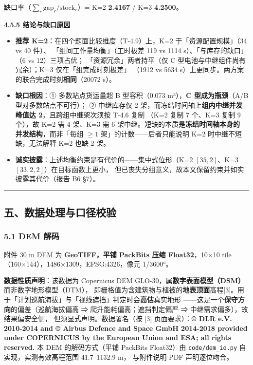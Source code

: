 \documentclass[
  10.5pt,
]{article}
\providecommand{\tightlist}{%
  \setlength{\itemsep}{0pt}\setlength{\parskip}{0pt}}
\begin{document}
缺口率（\(\sum_r \text{gap}_r/\text{stock}_r\)）= K=2 \textbf{2.4167} /
K=3 \textbf{4.2500}。

\textbf{4.5.5 结论与缺口原因}

\begin{itemize}
\tightlist
\item
  \textbf{推荐 K=2}：在四个题面比较维度（T-4.9）上，K=2
  于「资源配置规模」（34 vs 40 件）、 「组间工作量均衡」（工时极差 119
  vs 1114 s）、「与库存的缺口」（6 vs 12）三项占优；
  「资源冗余」两者持平（仅 C 型电池与中继组件尚有冗余）；K=3
  仅在「组完成时刻极差」 （1912 vs 5634
  s）上更同步。两方案的联合完成时刻\textbf{相同}（20072 s）。
\item
  \textbf{缺口根因}：① 多数站点货运量超 B 型容积（0.073 m³），\textbf{C
  型成为瓶颈}（A/B 型对多数站点不可行）； ② 中继库存仅 2
  架，而冻结时间轴上\textbf{组内中继并发峰值达 2}，且跨组中继架次须按
  T-4.6 复制 （K=2 复制 7 个、K=3 复制 9 个），故 K=2 需 4 架、K=3 需 6
  架中继。短缺的本质是\textbf{冻结时间轴本身的 并发结构}，而非「每组
  \(\ge 1\) 架」的计数------后者只能说明 K=2 时中继不短缺，无法解释 K=2
  也缺 2 架。
\item
  \textbf{诚实披露}：上述均衡约束是有代价的------集中式位形（K=2
  \([35,2]\)、K=3 \([33,2,2]\)）在目标函数上更小，
  但已丧失分组意义，故本文保留约束并如实披露其代价（报告 B6 §7）。
\end{itemize}

\begin{center}\rule{0.5\linewidth}{0.5pt}\end{center}

\subsection{五、数据处理与口径校验}\label{ux4e94ux6570ux636eux5904ux7406ux4e0eux53e3ux5f84ux6821ux9a8c}

\subsubsection{5.1 DEM 解码}\label{dem-ux89e3ux7801}

附件 30 m DEM 为 \textbf{GeoTIFF，平铺 PackBits 压缩 Float32}，10×10
tile（160×144），1486×1309，EPSG:4326，像元 1/3600°。

\textbf{数据性质声明}：该数据为 Copernicus DEM
GLO-30，属\textbf{数字表面模型（DSM）}而非数字地形模型（DTM），
即栅格值为含建筑物与植被的\textbf{地表顶面}高程{[}3{]}。用于「计划巡航海拔」与「视线遮挡」判定时会\textbf{高估}真实地形
------这是一个\textbf{保守方向}的偏差（巡航海拔偏高 ⇒
爬升能耗偏高；遮挡判定偏严 ⇒ 中继需求偏多），故结果偏安全侧，
但须显式声明。数据署名（按 {[}3{]} 页面要求）：\textbf{© DLR e.V.
2010-2014 and © Airbus Defence and Space GmbH 2014-2018 provided under
COPERNICUS by the European Union and ESA; all rights reserved.} 本 DEM
的解码方式（平铺 PackBits Float32）由 \texttt{code/dem\_io.py}
自实现，实测有效高程范围 41.7--1132.9 m， 与附件说明 PDF 声明逐位吻合。
\end{document}
